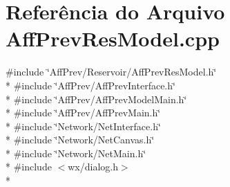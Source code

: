 \section{Referência do Arquivo Aff\+Prev\+Res\+Model.\+cpp}
\label{_aff_prev_res_model_8cpp}
{\ttfamily \#include \char`\"{}Aff\+Prev/\+Reservoir/\+Aff\+Prev\+Res\+Model.\+h\char`\"{}}\\*
{\ttfamily \#include \char`\"{}Aff\+Prev/\+Aff\+Prev\+Interface.\+h\char`\"{}}\\*
{\ttfamily \#include \char`\"{}Aff\+Prev/\+Aff\+Prev\+Model\+Main.\+h\char`\"{}}\\*
{\ttfamily \#include \char`\"{}Aff\+Prev/\+Aff\+Prev\+Main.\+h\char`\"{}}\\*
{\ttfamily \#include \char`\"{}Network/\+Net\+Interface.\+h\char`\"{}}\\*
{\ttfamily \#include \char`\"{}Network/\+Net\+Canvas.\+h\char`\"{}}\\*
{\ttfamily \#include \char`\"{}Network/\+Net\+Main.\+h\char`\"{}}\\*
{\ttfamily \#include $<$wx/dialog.\+h$>$}\\*
